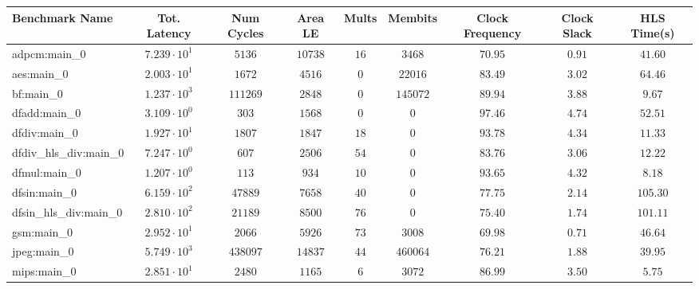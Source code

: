 \begin{tabular}{|l|c|c|c|c|c|c|c|c|}
\hline
Benchmark Name          & Tot. Latency           & Num Cycles & Area LE   & Mults   & Membits    & Clock Frequency & Clock Slack & HLS Time(s) \\
\hline
adpcm:main\_0           & $ 7.239 \cdot 10^{1} $ & $ 5136   $ & $ 10738 $ & $ 16  $ & $ 3468   $ & $ 70.95       $ & $ 0.91    $ & $ 41.60   $ \\
aes:main\_0             & $ 2.003 \cdot 10^{1} $ & $ 1672   $ & $ 4516  $ & $ 0   $ & $ 22016  $ & $ 83.49       $ & $ 3.02    $ & $ 64.46   $ \\
bf:main\_0              & $ 1.237 \cdot 10^{3} $ & $ 111269 $ & $ 2848  $ & $ 0   $ & $ 145072 $ & $ 89.94       $ & $ 3.88    $ & $ 9.67    $ \\
dfadd:main\_0           & $ 3.109 \cdot 10^{0} $ & $ 303    $ & $ 1568  $ & $ 0   $ & $ 0      $ & $ 97.46       $ & $ 4.74    $ & $ 52.51   $ \\
dfdiv:main\_0           & $ 1.927 \cdot 10^{1} $ & $ 1807   $ & $ 1847  $ & $ 18  $ & $ 0      $ & $ 93.78       $ & $ 4.34    $ & $ 11.33   $ \\
dfdiv\_hls\_div:main\_0 & $ 7.247 \cdot 10^{0} $ & $ 607    $ & $ 2506  $ & $ 54  $ & $ 0      $ & $ 83.76       $ & $ 3.06    $ & $ 12.22   $ \\
dfmul:main\_0           & $ 1.207 \cdot 10^{0} $ & $ 113    $ & $ 934   $ & $ 10  $ & $ 0      $ & $ 93.65       $ & $ 4.32    $ & $ 8.18    $ \\
dfsin:main\_0           & $ 6.159 \cdot 10^{2} $ & $ 47889  $ & $ 7658  $ & $ 40  $ & $ 0      $ & $ 77.75       $ & $ 2.14    $ & $ 105.30  $ \\
dfsin\_hls\_div:main\_0 & $ 2.810 \cdot 10^{2} $ & $ 21189  $ & $ 8500  $ & $ 76  $ & $ 0      $ & $ 75.40       $ & $ 1.74    $ & $ 101.11  $ \\
gsm:main\_0             & $ 2.952 \cdot 10^{1} $ & $ 2066   $ & $ 5926  $ & $ 73  $ & $ 3008   $ & $ 69.98       $ & $ 0.71    $ & $ 46.64   $ \\
jpeg:main\_0            & $ 5.749 \cdot 10^{3} $ & $ 438097 $ & $ 14837 $ & $ 44  $ & $ 460064 $ & $ 76.21       $ & $ 1.88    $ & $ 39.95   $ \\
mips:main\_0            & $ 2.851 \cdot 10^{1} $ & $ 2480   $ & $ 1165  $ & $ 6   $ & $ 3072   $ & $ 86.99       $ & $ 3.50    $ & $ 5.75    $ \\

\end{tabular}
